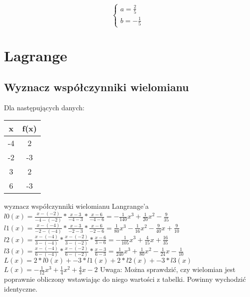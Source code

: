 \documentclass{article}
\begin{document}
\begin{equation*}\begin{cases}
    a=\frac{2}{5}\\
    b=-\frac{1}{5}
\end{cases}\end{equation*}

\section{Lagrange}
\subsection{Wyznacz współczynniki wielomianu}
Dla następujących danych:
\begin{table}[H]
\begin{tabular}{|c|c|}
\hline
x  & f(x) \\ \hline
-4 & 2    \\ \hline
-2 & -3   \\ \hline
3  & 2    \\ \hline
6  & -3   \\ \hline
\end{tabular}
\end{table}
wyznacz współczynniki wielomianu Langrange'a\\
$l0(x)=\frac{x- (-2)}{-4- (-2)}*\frac{x-3}{-4-3}*\frac{x-6}{-4-6} = -\frac{1}{140}x^3+\frac{1}{20}x^2-\frac{9}{35}$\\ %
$l1(x)=\frac{x- (-4)}{-2- (-4)}*\frac{x-3}{-2-3}*\frac{x-6}{-2-6} = \frac{1}{80}x^3-\frac{1}{16}x^2-\frac{9}{40}x+\frac{9}{10}$\\ %
$l2(x)=\frac{x- (-4)}{3- (-4)}*\frac{x- (-2)}{3- (-2)}*\frac{x-6}{3-6} = -\frac{1}{105}x^3+\frac{4}{15}x+\frac{16}{35}$\\ %
$l3(x)=\frac{x- (-4)}{6- (-4)}*\frac{x- (-2)}{6- (-2)}*\frac{x-3}{6-3} = \frac{1}{240}x^3+\frac{1}{80}x^2-\frac{1}{24}x-\frac{1}{10}$\\ %
$L(x)=2*l0(x)+-3*l1(x)+2*l2(x)+-3*l3(x)$\\
$L(x)=-\frac{1}{12}x^3+\frac{1}{4}x^2+\frac{4}{3}x-2$
Uwaga: Można sprawdzić, czy wielomian jest poprawnie obliczony wstawiając do niego wartości z tabelki. Powinny wychodzić identyczne.
\end{document}
